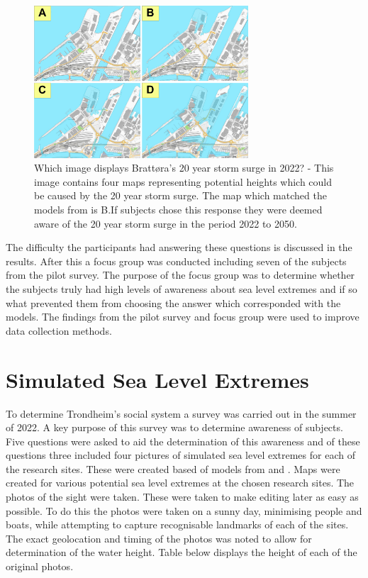 \begin{figure}[h!]
    \centering
    \includegraphics[width=8cm]{fig/brattora question on 2022 20 yr storm surge quadrant.png}
    \caption{Which image displays Brattøra's 20 year storm surge in 2022? - This image contains four maps representing potential heights which could be caused by the 20 year storm surge. The map which matched the models from \cite{kartverket_se_2021} is B.If subjects chose this response they were deemed aware of the 20 year storm surge in the period 2022 to 2050.}
    \label{fig:brattora_2022_stormsurge}
\end{figure}

The difficulty the participants had answering these questions is discussed in the results. After this a focus group was conducted including seven of the subjects from the pilot survey. The purpose of the focus group was to determine whether the subjects truly had high levels of awareness about sea level extremes and if so what prevented them from choosing the answer which corresponded with the models. The findings from the pilot survey and focus group were used to improve data collection methods. 

\section{Simulated Sea Level Extremes}
To determine Trondheim's social system a survey was carried out in the summer of 2022. A key purpose of this survey was to determine awareness of subjects. 
Five questions were asked to aid the determination of this awareness and of these questions three included four pictures of simulated sea level extremes for each of the research sites. These were created based of models from \cite{noauthor_se_2021} \cite{noauthor_integrating-sea-level-rise-and-storm-surges--local-planningpdf_2017} and \cite{noauthor_stormflo_2021}. Maps were created for various potential sea level extremes at the chosen research sites. The photos of the sight were taken. These were taken to make editing later as easy as possible. To do this the photos were taken on a sunny day, minimising people and boats, while attempting to capture recognisable landmarks of each of the sites. The exact geolocation and timing of the photos was noted to allow for determination of the water height. Table below displays the height of each of the original photos. 

